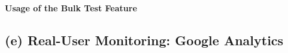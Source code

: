 








\paragraph{Usage of the Bulk Test Feature}









\subsection{(e) Real-User Monitoring: Google Analytics}

